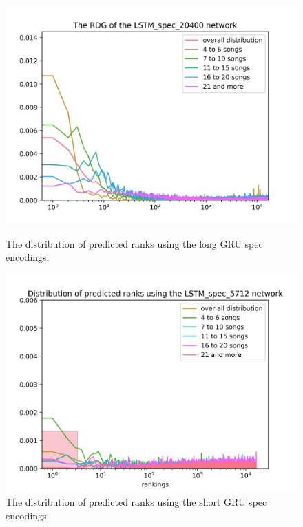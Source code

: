 \begin{figure}[hbt!]
\centering
\begin{minipage}{.5\textwidth}
  \centering
  \includegraphics[width=1\linewidth]{./img/lstm_spec_20400_graph.png}
  \caption{The distribution of predicted ranks using the long GRU spec encodings.}
  \label{fig:lstm_spec_20400_distribution}
\end{minipage}%
\begin{minipage}{.5\textwidth}
  \centering
  \includegraphics[width=1\linewidth]{./img/lstm_spec_5712_graph.png}
  \caption{The distribution of predicted ranks using the short GRU spec encodings.}
  \label{fig:lstm_spec_5712_distribution}
\end{minipage}
\end{figure}\label{fig:lstm_spec_distributions}

